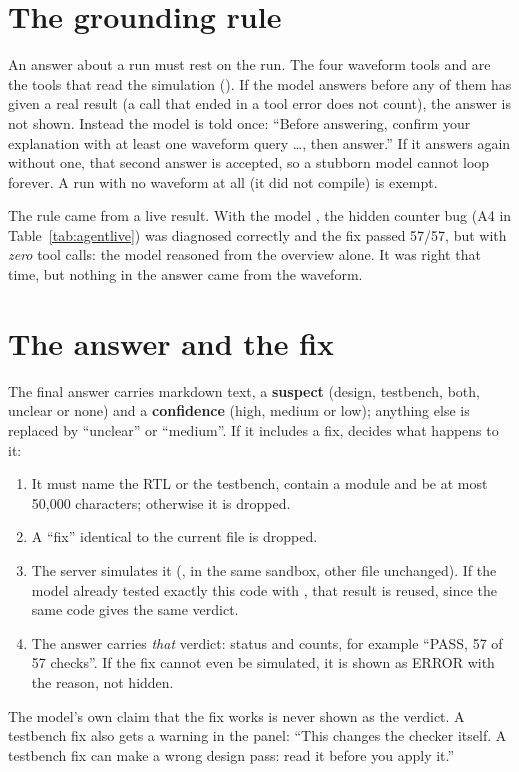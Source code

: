 \section{The grounding rule}

An answer about a run must rest on the run. The four waveform tools and  are the tools that read the simulation (). If the model answers before any of them has given a real result (a call that ended in a tool error does not count), the answer is not shown. Instead the model is told once: ``Before answering, confirm your explanation with at least one waveform query \ldots, then answer.'' If it answers again without one, that second answer is accepted, so a stubborn model cannot loop forever. A run with no waveform at all (it did not compile) is exempt.

The rule came from a live result. With the model , the hidden counter bug (A4 in Table~\ref{tab:agentlive}) was diagnosed correctly and the fix passed 57/57, but with \emph{zero} tool calls: the model reasoned from the overview alone. It was right that time, but nothing in the answer came from the waveform.

\section{The answer and the fix}

The final answer carries markdown text, a \textbf{suspect} (design, testbench, both, unclear or none) and a \textbf{confidence} (high, medium or low); anything else is replaced by ``unclear'' or ``medium''. If it includes a fix,  decides what happens to it:
\begin{enumerate}
  \item It must name the RTL or the testbench, contain a module and be at most 50,000 characters; otherwise it is dropped.
  \item A ``fix'' identical to the current file is dropped.
  \item The server simulates it (, in the same sandbox, other file unchanged). If the model already tested exactly this code with , that result is reused, since the same code gives the same verdict.
  \item The answer carries \emph{that} verdict: status and counts, for example ``PASS, 57 of 57 checks''. If the fix cannot even be simulated, it is shown as ERROR with the reason, not hidden.
\end{enumerate}
The model's own claim that the fix works is never shown as the verdict. A testbench fix also gets a warning in the panel: ``This changes the checker itself. A testbench fix can make a wrong design pass: read it before you apply it.''


